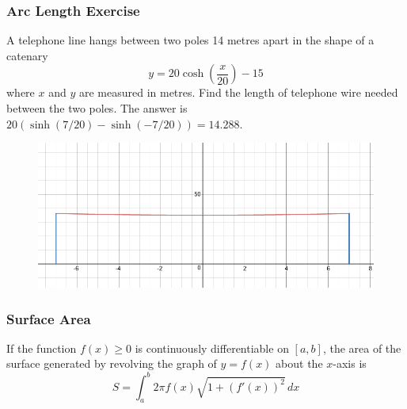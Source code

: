 \documentclass[xcolor=dvipsnames]{beamer}
\begin{document}
\begin{frame}
  \frametitle{Arc Length Exercise}
{\ubung} A telephone line hangs between two poles 14 metres apart in
the shape of a catenary
\begin{equation}
  \label{eq:aeweerae}
  y=20\cosh\left(\frac{x}{20}\right)-15
\end{equation}
where $x$ and $y$ are measured in metres. Find the length of telephone
wire needed between the two poles. The answer is $20(\sinh(7/20)-\sinh(-7/20))=14.288$.
\begin{figure}[h]
  \includegraphics[scale=0.22]{./diagrams/telwire.png}
\end{figure}
\end{frame}

\begin{frame}
  \frametitle{Surface Area}
  If the function $f(x)\geq{}0$ is continuously differentiable on
  $[a,b]$, the \alert{area of the surface} generated by revolving the
  graph of $y=f(x)$ about the $x$-axis is
  \begin{equation}
    \label{eq:xaimosah}
    S=\int_{a}^{b}2\pi{}f(x)\sqrt{1+\left(f'(x)\right)^{2}}\,dx
  \end{equation}
\end{frame}
\end{document}
